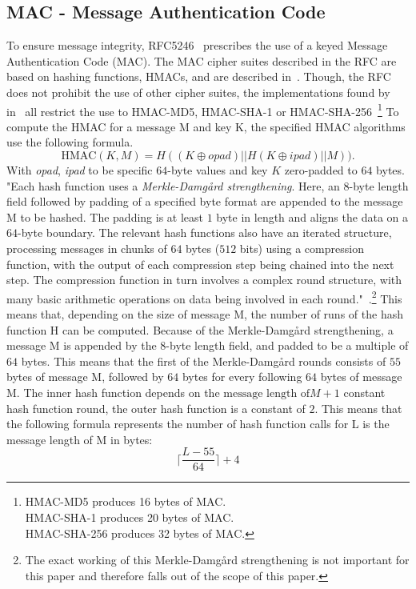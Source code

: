 \documentclass[10pt,conference,a4paper]{IEEEtran}
\begin{document}
\subsection{MAC - Message Authentication Code}
\label{sec:crypto:hmac}
To ensure message integrity, RFC5246~\cite{ietf2008transport} prescribes the use of a keyed Message Authentication Code (MAC). The MAC cipher suites described in the RFC are based on hashing functions, HMACs, and are described in~\cite{krawczyk1997rfc}. Though, the RFC does not prohibit the use of other cipher suites, the implementations found by~\citeauthor{alfardan2013lucky} in~\cite{alfardan2013lucky} all restrict the use to HMAC-MD5, HMAC-SHA-1 or HMAC-SHA-256~\footnote{HMAC-MD5 produces 16 bytes of MAC.\\HMAC-SHA-1 produces 20 bytes of MAC.\\HMAC-SHA-256 produces 32 bytes of MAC.} To compute the HMAC for a message M and key K, the specified HMAC algorithms use the following formula. 
\[ \text{HMAC}(K,M) = H((K \oplus opad)||H(K \oplus ipad)||M)). \]
With \textit{opad}, \textit{ipad} to be specific $64$-byte values and key $K$ zero-padded to $64$ bytes. "Each hash function uses a \textit{Merkle-Damg\aa rd strengthening}. Here, an 8-byte length field followed by padding of a specified byte format are appended to the message M to be hashed. The padding is at least $1$ byte in length and aligns the data on a $64$-byte boundary. The relevant hash functions also have an iterated structure, processing messages in chunks of $64$ bytes ($512$ bits) using a compression function, with the output of each compression step being chained into the next step. The compression function in turn involves a complex round structure, with many basic arithmetic operations on data being involved in each round."~\cite{alfardan2013lucky}.\footnote{The exact working of this Merkle-Damg\aa rd strengthening is not important for this paper and therefore falls out of the scope of this paper.}
This means that, depending on the size of message M, the number of runs of the hash function H can be computed. Because of the Merkle-Damg\aa rd strengthening, a message M is appended by the $8$-byte length field, and padded to be a multiple of $64$ bytes. This means that the first of the Merkle-Damg\aa rd rounds consists of $55$ bytes of message M, followed by $64$ bytes for every following $64$ bytes of message M. The inner hash function depends on the $\text{message length of} M + 1$ constant hash function round, the outer hash function is a constant of $2$. This means that the following formula represents the number of hash function calls for L is the message length of M in bytes:
\[ \lceil \frac{L - 55}{64} \rceil + 4 \]
\end{document}
